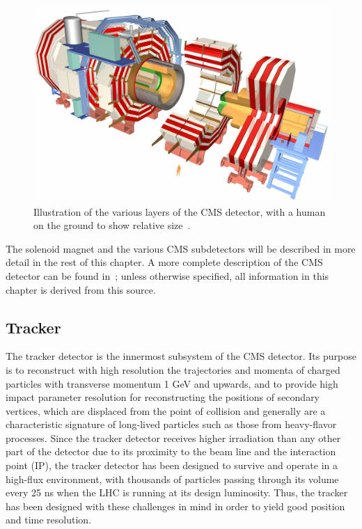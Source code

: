 \begin{figure}[hbtp]
  \begin{center}
    \includegraphics[width=2.0\cmsFigWidth]{figures/wholeCMS3D}
    \caption{Illustration of the various layers of the CMS detector, with a human on the ground to show relative size~\cite{CMSimage}.}
    \label{fig:cms}
  \end{center}
\end{figure}

The solenoid magnet and the various CMS subdetectors will be described in more detail in the rest of this chapter. A more complete description of the CMS detector can be found in~\cite{1748-0221-3-08-S08004}; unless otherwise specified, all information in this chapter is derived from this source.

\subsection{Tracker\label{sec:cms-tracker}}

The tracker detector is the innermost subsystem of the CMS detector. Its purpose is to reconstruct with high resolution the trajectories and momenta of charged particles with transverse momentum 1 GeV and upwards, and to provide high impact parameter resolution for reconstructing the positions of secondary vertices, which are displaced from the point of collision and generally are a characteristic signature of long-lived particles such as those from heavy-flavor processes. Since the tracker detector receives higher irradiation than any other part of the detector due to its proximity to the beam line and the interaction point (IP), the tracker detector has been designed to survive and operate in a high-flux environment, with thousands of particles passing through its volume every 25 ns when the LHC is running at its design luminosity. Thus, the tracker has been designed with these challenges in mind in order to yield good position and time resolution.

